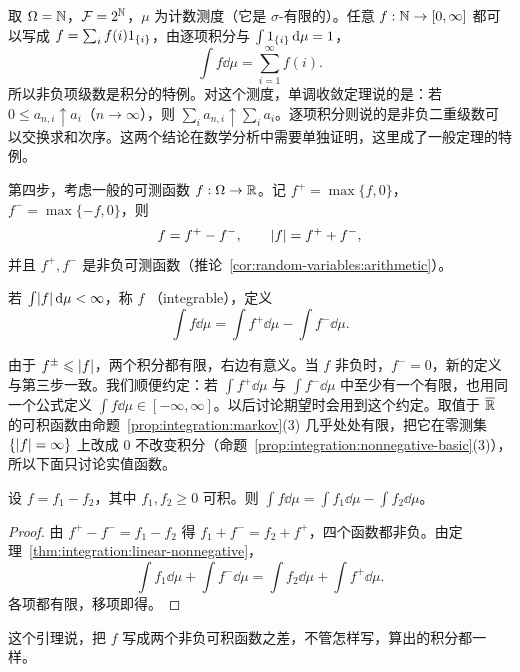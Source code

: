 \begin{example}[计数测度与级数]
取 $\Omega=\mathbb{N}$，$\mathcal{F}=2^{\mathbb{N}}$，$\mu$ 为计数测度（它是 $\sigma$-有限的）。任意 $f:\mathbb{N}\to[0,\infty]$ 都可以写成 $f=\sum_if(i)1_{\{i\}}$，由逐项积分与 $\int1_{\{i\}}\,\mathrm{d}\mu=1$，
\[
\int f\dd\mu=\sum_{i=1}^\infty f(i).
\]
所以非负项级数是积分的特例。对这个测度，单调收敛定理说的是：若 $0\leqslant a_{n,i}\uparrow a_i$（$n\to\infty$），则 $\sum_ia_{n,i}\uparrow\sum_ia_i$。逐项积分则说的是非负二重级数可以交换求和次序。这两个结论在数学分析中需要单独证明，这里成了一般定理的特例。
\end{example}


第四步，考虑一般的可测函数 $f:\Omega\to\mathbb{R}$。记 $f^+=\max\{f,0\}$，$f^-=\max\{-f,0\}$，则
\[
f=f^+-f^-,\qquad\lvert f\rvert=f^++f^-,
\]
并且 $f^+,f^-$ 是非负可测函数（推论~\ref{cor:random-variables:arithmetic}）。

\begin{definition}[可积函数]\label{def:integration:integrable}
若 $\int\lvert f\rvert\,\mathrm{d}\mu<\infty$，称 $f$ （integrable），定义
\[
\int f\dd\mu=\int f^+\dd\mu-\int f^-\dd\mu .
\]
\end{definition}

由于 $f^\pm\leqslant\lvert f\rvert$，两个积分都有限，右边有意义。当 $f$ 非负时，$f^-=0$，新的定义与第三步一致。我们顺便约定：若 $\int f^+\dd\mu$ 与 $\int f^-\dd\mu$ 中至少有一个有限，也用同一个公式定义 $\int f\dd\mu\in[-\infty,\infty]$。以后讨论期望时会用到这个约定。取值于 $\overline{\mathbb{R}}$ 的可积函数由命题~\ref{prop:integration:markov}(3) 几乎处处有限，把它在零测集 $\{\lvert f\rvert=\infty\}$ 上改成 $0$ 不改变积分（命题~\ref{prop:integration:nonnegative-basic}(3)），所以下面只讨论实值函数。

\begin{lemma}\label{lem:integration:difference}
设 $f=f_1-f_2$，其中 $f_1,f_2\geqslant0$ 可积。则 $\int f\dd\mu=\int f_1\dd\mu-\int f_2\dd\mu$。
\end{lemma}
\begin{proof}
由 $f^+-f^-=f_1-f_2$ 得 $f_1+f^-=f_2+f^+$，四个函数都非负。由定理~\ref{thm:integration:linear-nonnegative}，
\[
\int f_1\dd\mu+\int f^-\dd\mu=\int f_2\dd\mu+\int f^+\dd\mu .
\]
各项都有限，移项即得。
\end{proof}

这个引理说，把 $f$ 写成两个非负可积函数之差，不管怎样写，算出的积分都一样。

